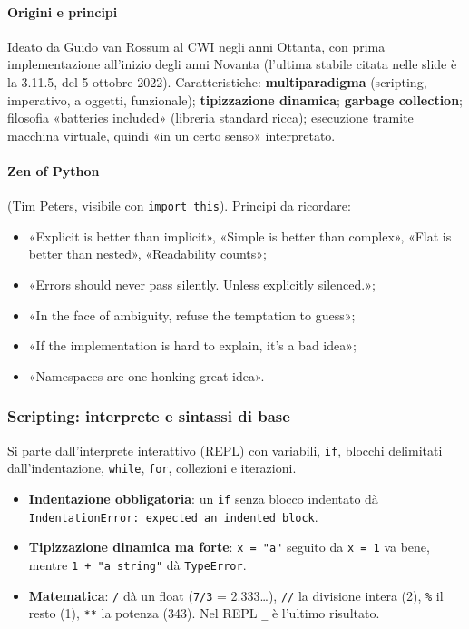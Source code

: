 \documentclass[a4paper,12pt]{article}
\begin{document}
\paragraph{Origini e principi} Ideato da Guido van Rossum al CWI negli anni Ottanta, con prima
implementazione all'inizio degli anni Novanta (l'ultima stabile citata nelle slide è la 3.11.5,
del 5 ottobre 2022). Caratteristiche: \textbf{multiparadigma} (scripting, imperativo,
a oggetti, funzionale); \textbf{tipizzazione dinamica}; \textbf{garbage collection};
filosofia «batteries included» (libreria standard ricca); esecuzione tramite macchina
virtuale, quindi «in un certo senso» interpretato.

\paragraph{Zen of Python} (Tim Peters, visibile con \texttt{import this}). Principi da
ricordare:
\begin{itemize}[nosep]
  \item «Explicit is better than implicit», «Simple is better than complex», «Flat is
        better than nested», «Readability counts»;
  \item «Errors should never pass silently. Unless explicitly silenced.»;
  \item «In the face of ambiguity, refuse the temptation to guess»;
  \item «If the implementation is hard to explain, it's a bad idea»;
  \item «Namespaces are one honking great idea».
\end{itemize}

\subsubsection{Scripting: interprete e sintassi di base}
Si parte dall'interprete interattivo (REPL) con variabili, \texttt{if}, blocchi delimitati
dall'indentazione, \texttt{while}, \texttt{for}, collezioni e iterazioni.
\begin{itemize}[nosep]
  \item \textbf{Indentazione obbligatoria}: un \texttt{if} senza blocco indentato dà
        \texttt{IndentationError: expected an indented block}.
  \item \textbf{Tipizzazione dinamica ma forte}: \texttt{x = "a"} seguito da \texttt{x = 1}
        va bene, mentre \texttt{1 + "a string"} dà \texttt{TypeError}.
  \item \textbf{Matematica}: \texttt{/} dà un float (\texttt{7/3} = 2.333\dots), \texttt{//}
        la divisione intera (2), \texttt{\%} il resto (1), \texttt{**} la potenza (343).
        Nel REPL \texttt{\_} è l'ultimo risultato.
\end{itemize}
\end{document}
